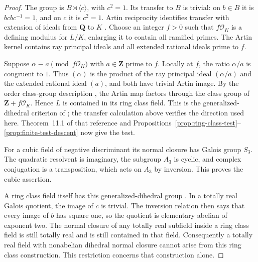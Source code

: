 \documentclass[11pt]{article}
\theoremstyle{definition}\newtheorem{definition}[theorem]{Definition}
\theoremstyle{remark}\newtheorem{remark}[theorem]{Remark}
\newcommand{\Q}{\mathbf Q}\newcommand{\Z}{\mathbf Z}
\begin{document}
\begin{proof}
The group is $B\rtimes\langle c\rangle$, with $c^2=1$. Its transfer to $B$
is trivial: on $b\in B$ it is $bcbc^{-1}=1$, and on $c$ it is $c^2=1$.
Artin reciprocity identifies transfer with extension of ideals from
$\Q$ to $K$ \cite[Chapter~V, \S3, Proposition~3.18 and the accompanying
diagram, p.~162]{MilneCFT}. Choose an integer $f>0$ such that $f\mathcal O_K$
is a defining modulus for $L/K$, enlarging it to contain all ramified
primes. The Artin kernel contains ray principal ideals and all extended
rational ideals prime to $f$.

Suppose $\alpha\equiv a\pmod{f\mathcal O_K}$ with $a\in\Z$ prime to $f$.
Locally at $f$, the ratio $\alpha/a$ is congruent to $1$. Thus $(\alpha)$
is the product of the ray principal ideal $(\alpha/a)$ and the extended
rational ideal $(a)$, and both have trivial Artin image. By the order
class-group description
\cite[Proposition~7.22, pp.~145--146]{CoxClassFields}, the Artin map
factors through the class group of $\Z+f\mathcal O_K$. Hence $L$ is
contained in its ring class field. This is the generalized-dihedral
criterion of \cite[Theorem~9.18, pp.~191--192]{CoxClassFields}; the transfer
calculation above verifies the direction used here. Theorem~11.1 of
that reference and Propositions~\ref{prop:ring-class-test}--\ref{prop:finite-test-descent}
now give the test.

For a cubic field of negative discriminant its normal closure has Galois
group $S_3$. The quadratic resolvent is imaginary, the subgroup $A_3$ is
cyclic, and complex conjugation is a transposition, which acts on $A_3$
by inversion. This proves the cubic assertion.

A ring class field itself has this generalized-dihedral group
\cite[Lemma~9.3, pp.~180--181]{CoxClassFields}. In a totally real Galois
quotient, the image of $c$ is trivial. The inversion relation then says
that every image of $b$ has square one, so the quotient is elementary
abelian of exponent two. The normal closure of any totally real subfield
inside a ring class field is still totally real and is still contained
in that field. Consequently a totally real field with nonabelian
dihedral normal closure cannot arise from this ring class construction.
This restriction concerns that construction alone.
\end{proof}
\end{document}
